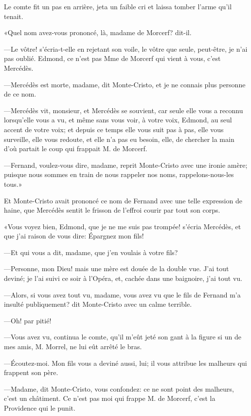 Le comte fit un pas en arrière, jeta un faible cri et laissa tomber l'arme qu'il tenait. 

«Quel nom avez-vous prononcé, là, madame de Morcerf? dit-il. 

—Le vôtre! s'écria-t-elle en rejetant son voile, le vôtre que seule, peut-être, je n'ai pas oublié. Edmond, ce n'est pas Mme de Morcerf qui vient à vous, c'est Mercédès. 

—Mercédès est morte, madame, dit Monte-Cristo, et je ne connais plus personne de ce nom. 

—Mercédès vit, monsieur, et Mercédès se souvient, car seule elle vous a reconnu lorsqu'elle vous a vu, et même sans vous voir, à votre voix, Edmond, au seul accent de votre voix; et depuis ce temps elle vous suit pas à pas, elle vous surveille, elle vous redoute, et elle n'a pas eu besoin, elle, de chercher la main d'où partait le coup qui frappait M. de Morcerf. 

—Fernand, voulez-vous dire, madame, reprit Monte-Cristo avec une ironie amère; puisque nous sommes en train de nous rappeler nos noms, rappelons-nous-les tous.» 

Et Monte-Cristo avait prononcé ce nom de Fernand avec une telle expression de haine, que Mercédès sentit le frisson de l'effroi courir par tout son corps. 

«Vous voyez bien, Edmond, que je ne me suis pas trompée! s'écria Mercédès, et que j'ai raison de vous dire: Épargnez mon fils! 

—Et qui vous a dit, madame, que j'en voulais à votre fils? 

—Personne, mon Dieu! mais une mère est douée de la double vue. J'ai tout deviné; je l'ai suivi ce soir à l'Opéra, et, cachée dans une baignoire, j'ai tout vu. 

—Alors, si vous avez tout vu, madame, vous avez vu que le fils de Fernand m'a insulté publiquement? dit Monte-Cristo avec un calme terrible. 

—Oh! par pitié! 

—Vous avez vu, continua le comte, qu'il m'eût jeté son gant à la figure si un de mes amis, M. Morrel, ne lui eût arrêté le bras. 

—Écoutez-moi. Mon fils vous a deviné aussi, lui; il vous attribue les malheurs qui frappent son père. 

—Madame, dit Monte-Cristo, vous confondez: ce ne sont point des malheurs, c'est un châtiment. Ce n'est pas moi qui frappe M. de Morcerf, c'est la Providence qui le punit. 

